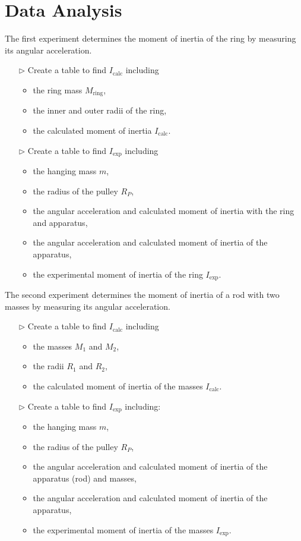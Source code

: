\section{Data Analysis}
The first experiment determines the moment of inertia of the ring by measuring its angular acceleration.
\begin{itemize}
\item[$\triangleright$] Create a table to find $I_{\mbox{calc}}$ including
  \begin{itemize}
  \item the ring mass $M_{\mbox{ring}}$,
  \item the inner and outer radii of the ring,
  \item the calculated moment of inertia $I_{\mbox{calc}}$.
  \end{itemize}
\item[$\triangleright$] Create a table to find $I_{\mbox{exp}}$ including
  \begin{itemize}
  \item the hanging mass $m$,
  \item the radius of the pulley $R_P$,
  \item the angular acceleration and calculated moment of inertia with the ring and apparatus,
  \item the angular acceleration and calculated moment of inertia of the apparatus,
  \item the experimental moment of inertia of the ring $I_{\mbox{exp}}$.
  \end{itemize}
\end{itemize}

The second experiment determines the moment of inertia of a rod with two masses by measuring its angular acceleration.
\begin{itemize}
\item[$\triangleright$] Create a table to find $I_{\mbox{calc}}$ including
  \begin{itemize}
  \item the masses $M_1$ and $M_2$,
  \item the radii $R_1$ and $R_2$,
  \item the calculated moment of inertia of the masses $I_{\mbox{calc}}$.
  \end{itemize}
\item[$\triangleright$] Create a table to find $I_{\mbox{exp}}$ including:
  \begin{itemize}
  \item the hanging mass $m$,
  \item the radius of the pulley $R_P$,
  \item the angular acceleration and calculated moment of inertia of the apparatus (rod) and masses,
  \item the angular acceleration and calculated moment of inertia of the apparatus,
  \item the experimental moment of inertia of the masses $I_{\mbox{exp}}$.
  \end{itemize}
\end{itemize}

